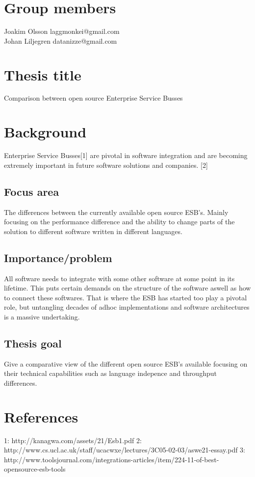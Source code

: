 \documentclass[11pt]{article} %
\begin{document}
\section{Group members}
Joakim Olsson laggmonkei@gmail.com \\
Johan Liljegren datanizze@gmail.com

\section{Thesis title}
Comparison between open source Enterprise Service Busses

\section{Background}
Enterprise Service Busses[1] are pivotal in software integration and are becoming extremely important in future software solutions and companies. [2]


\subsection{Focus area}
The differences between the currently available open source ESB’s.
Mainly focusing on the performance difference and the ability to change parts of the solution to different software written in different languages.

\subsection{Importance/problem}
All software needs to integrate with some other software at some point in its lifetime.
This puts certain demands on the structure of the software aswell as how to connect these
softwares. That is where the ESB has started too play a pivotal role, but untangling
decades of adhoc implementations and software architectures is a massive undertaking.

\subsection{Thesis goal}
Give a comparative view of the different open source ESB’s available focusing on their
technical capabilities such as language indepence and throughput differences.

\section{References}
1: http://kanagwa.com/assets/21/Esb1.pdf
2:  http://www.cs.ucl.ac.uk/staff/ucacwxe/lectures/3C05-02-03/aswe21-essay.pdf
3: http://www.toolsjournal.com/integrations-articles/item/224-11-of-best-opensource-esb-tools
\end{document}
